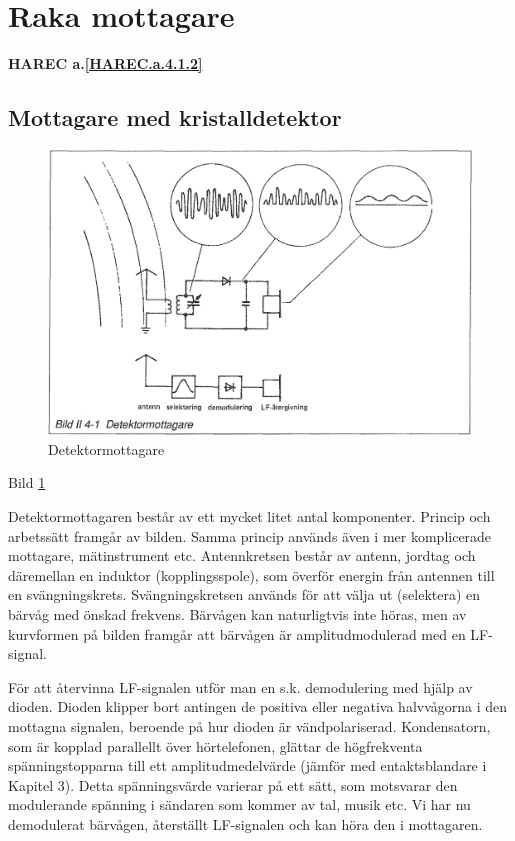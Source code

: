 \section{Raka mottagare}
\textbf{HAREC a.\ref{HAREC.a.4.1.2}\label{myHAREC.a.4.1.2}}

\subsection{Mottagare med kristalldetektor}

\begin{figure}
  \includegraphics[width=\textwidth]{images/bild_2_4-01}
  \caption{Detektormottagare}
  \label{fig:bildII4-1}
\end{figure}

Bild \ref{fig:bildII4-1}

Detektormottagaren består av ett mycket litet antal
komponenter. Princip och arbetssätt framgår av bilden. Samma princip
används även i mer komplicerade mottagare, mätinstrument
etc. Antennkretsen består av antenn, jordtag och däremellan en
induktor (kopplingsspole), som överför energin från antennen till en
svängningskrets. Svängningskretsen används för att välja ut (selektera)
en bärvåg med önskad frekvens. Bärvågen kan naturligtvis inte
höras, men av kurvformen på bilden framgår att bärvågen är
amplitudmodulerad med en LF-signal.

För att återvinna LF-signalen utför man en s.k. demodulering med hjälp
av dioden.  Dioden klipper bort antingen de positiva eller negativa
halvvågorna i den mottagna signalen, beroende på hur dioden är
vändpolariserad. Kondensatorn, som är kopplad parallellt över
hörtelefonen, glättar de högfrekventa spänningstopparna till ett
amplitudmedelvärde (jämför med entaktsblandare i Kapitel 3). Detta
spänningsvärde varierar på ett sätt, som motsvarar den modulerande
spänning i sändaren som kommer av tal, musik etc. Vi har nu
demodulerat bärvågen, återställt LF-signalen och kan höra den i
mottagaren.


